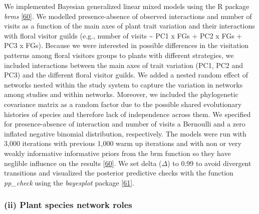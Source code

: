 \documentclass[
  12pt,
  a4paper,
]{article}
\begin{document}
We implemented Bayesian generalized linear mixed models using the R package \emph{brms} {[}\protect\hyperlink{ref-burkner2017}{60}{]}. We modelled presence-absence of observed interactions and number of visits as a function of the main axes of plant trait variation and their interactions with floral visitor guilds (e.g., number of visits \textasciitilde{} PC1 x FGs + PC2 x FGs + PC3 x FGs). Because we were interested in possible differences in the visitation patterns among floral visitors groups to plants with different strategies, we included interactions between the main axes of trait variation (PC1, PC2 and PC3) and the different floral visitor guilds. We added a nested random effect of networks nested within the study system to capture the variation in networks among studies and within networks. Moreover, we included the phylogenetic covariance matrix as a random factor due to the possible shared evolutionary histories of species and therefore lack of independence across them. We specified for presence-absence of interaction and number of visits a Bernoulli and a zero inflated negative binomial distribution, respectively. The models were run with 3,000 iterations with previous 1,000 warm up iterations and with non or very weakly informative informative priors from the brm function so they have neglible influence on the results {[}\protect\hyperlink{ref-burkner2017}{60}{]}. We set delta (\(\Delta\)) to 0.99 to avoid divergent transitions and visualized the posterior predictive checks with the function \emph{pp\_check} using the \emph{bayesplot} package {[}\protect\hyperlink{ref-gabry2019}{61}{]}.

\hypertarget{ii-plant-species-network-roles}{%
\subsubsection{(ii) Plant species network roles}\label{ii-plant-species-network-roles}}
\end{document}
